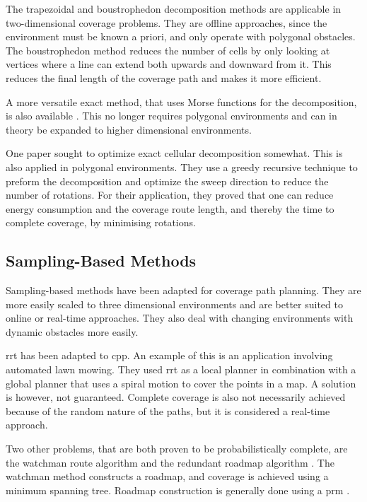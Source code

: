 The trapezoidal and boustrophedon decomposition methods are applicable in two-dimensional coverage problems. They are offline approaches, since the environment must be known a priori, and only operate with polygonal obstacles. The boustrophedon method reduces the number of cells by only looking at vertices where a line can extend both upwards and downward from it. This reduces the final length of the coverage path and makes it more efficient. \cite{CPP-Survey-2013} 

A more versatile exact method, that uses Morse functions for the decomposition, is also available \cite{Choset-Morse2000}. This no longer requires polygonal environments and can in theory be expanded to higher dimensional environments.

One paper sought to optimize exact cellular decomposition somewhat. This is also applied in polygonal environments. They use a greedy recursive technique to preform the decomposition and optimize the sweep direction to reduce the number of rotations. For their application, they proved that one can reduce energy consumption and the coverage route length, and thereby the time to complete coverage, by minimising rotations. \cite{Li2011}
\subsection{Sampling-Based Methods}
\label{sec:LR - sSampling}
Sampling-based methods have been adapted for coverage path planning. They are more easily scaled to three dimensional environments and are better suited to online or real-time approaches. They also deal with changing environments with dynamic obstacles more easily. \cite{Lavalle2006}

\ac{rrt} has been adapted to \ac{cpp}. An example of this is an application involving automated lawn mowing. They used \ac{rrt} as a local planner in combination with a global planner that uses a spiral motion to cover the points in a map. A solution is however, not guaranteed. Complete coverage is also not necessarily achieved because of the random nature of the paths, but it is considered a real-time approach. \cite{Nourani-Vatani2006}

Two other problems, that are both proven to be probabilistically complete, are the watchman route algorithm and the redundant roadmap algorithm \cite{Englot2012}. The watchman method constructs a roadmap, and coverage is achieved using a minimum spanning tree. Roadmap construction is generally done using a \ac{prm} \cite{Danner2000}.%

